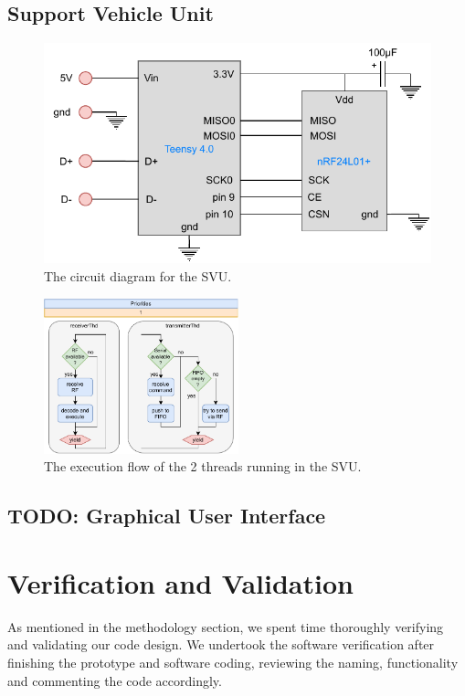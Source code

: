 \documentclass[conference]{IEEEtran}
\newcommand{\todo}[1]{{\color{olive} TODO: #1}}
\begin{document}


\subsection{Support Vehicle Unit}
\begin{figure}
    \centering
    \includegraphics[width=\linewidth]{documentation/images/SVU_CircuitDiagram.pdf}
    \caption{The circuit diagram for the SVU.}
    \label{fig:SVU_circuit}
\end{figure}
\begin{figure}
    \centering
    \includegraphics[height=4.5cm]{documentation/images/SVU_threads.pdf}
    \caption{The execution flow of the 2 threads running in the SVU.}
    \label{fig:SVU_threads}
\end{figure}
\subsection{\todo{Graphical User Interface}}


\section{Verification and Validation} %
As mentioned in the methodology section, we spent time thoroughly verifying and validating our code design. We undertook the software verification after finishing the prototype and software coding, reviewing the naming, functionality and commenting the code accordingly.
\end{document}
